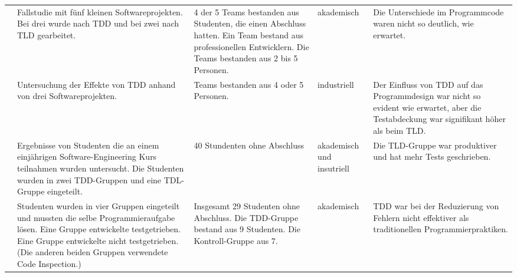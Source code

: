 \begin{table*}[t]
\begin{tabularx}{\textwidth}{@{}Xp{}p{}p{}p{}@{}}
\cite{Siniaalto2008DoesStudy}                & Fallstudie mit fünf kleinen Softwareprojekten. Bei drei wurde nach TDD und bei zwei nach TLD gearbeitet.                                                                                                                                 & 4 der 5 Teams bestanden aus Studenten, die einen Abschluss hatten. Ein Team bestand aus professionellen Entwicklern. Die Teams bestanden aus 2 bis 5 Personen. & akademisch                & Die Unterschiede im Programmcode waren nicht so deutlich, wie erwartet.                                                                                                                                                                                         \\
\cite{Siniaalto2007ACoverage}                & Untersuchung der Effekte von TDD anhand von drei Softwareprojekten.                                                                                                                                                                      & Teams bestanden aus 4 oder 5 Personen.                                                                                                                         & industriell               & Der Einfluss von TDD auf das Programmdesign war nicht so evident wie erwartet, aber die Testabdeckung war signifikant höher als beim TLD.                                                                                                                       \\
\cite{Vu2009EvaluatingProject}               & Ergebnisse von Studenten die an einem einjährigen Software-Engineering Kurs teilnahmen wurden untersucht. Die Studenten wurden in zwei TDD-Gruppen und eine TDL-Gruppe eingeteilt.                                                       & 40 Stundenten ohne Abschluss                                                                                                                                   & akademisch und insutriell & Die TLD-Gruppe war produktiver und hat mehr Tests geschrieben.                                                                                                                                                                                                  \\
\cite{Wilkerson2012ComparingDevelopment}     & Studenten wurden in vier Gruppen eingeteilt und mussten die selbe Programmieraufgabe lösen. Eine Gruppe entwickelte testgetrieben. Eine Gruppe entwickelte nicht testgetrieben. (Die anderen beiden Gruppen verwendete Code Inspection.) & Insgesamt 29 Studenten ohne Abschluss. Die TDD-Gruppe bestand aus 9 Studenten. Die Kontroll-Gruppe aus 7.                                                      & akademisch                & TDD war bei der Reduzierung von Fehlern nicht effektiver als traditionellen Programmierpraktiken.                                                                                                                                                               \\ \bottomrule
\end{tabularx}
\end{table*}

